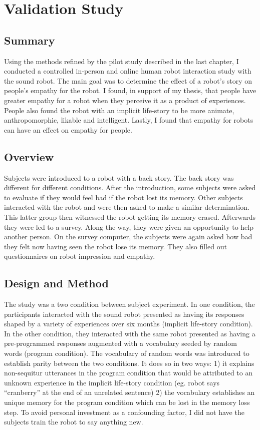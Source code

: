 \chapter{Validation Study}
\label{chap_study}

\section{Summary}

Using the methods refined by the pilot study described in the last chapter, I conducted a controlled in-person and online human robot interaction study with the sound robot. The main goal was to determine the effect of a robot's story on people's empathy for the robot. I found, in support of my thesis, that people have greater empathy for a robot when they perceive it as a product of experiences.  People also found the robot with an implicit life-story to be more animate, anthropomorphic, likable and intelligent. Lastly, I found that empathy for robots can have an effect on empathy for people. 


\section{Overview}

Subjects were introduced to a robot with a back story. The back story was different for different conditions. After the introduction, some subjects were asked to evaluate if they would feel bad if the robot lost its memory. Other subjects interacted with the robot and were then asked to make a similar determination. This latter group then witnessed the robot getting its memory erased. Afterwards they were led to a survey. Along the way, they were given an opportunity to help another person. On the survey computer, the subjects were again asked how bad they felt now having seen the robot lose its memory. They also filled out questionnaires on robot impression and empathy. 


\section{Design and Method}


The study was a two condition between subject experiment. In one condition, the participants interacted with the sound robot presented as having its responses shaped by a variety of experiences over six months (implicit life-story condition). In the other condition, they interacted with the same robot presented as having a pre-programmed responses augmented with a  vocabulary seeded by random words (program condition). The vocabulary of random words was introduced to establish parity between the two conditions. It does so in two ways: 1) it explains non-sequitur utterances in the program condition that would be attributed to an unknown experience in the implicit life-story condition (eg. robot says ``cranberry'' at the end of an unrelated sentence) 2) the vocabulary establishes an unique memory for the program condition which can be lost in the memory loss step. To avoid personal investment as a confounding factor, I did not have the subjects train the robot to say anything new.  

